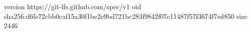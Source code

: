 version https://git-lfs.github.com/spec/v1
oid sha256:d6fe72cbb0caf15a30f1be2e9bd721bc283f9842f07c11487f57f3674f7ed850
size 2446
